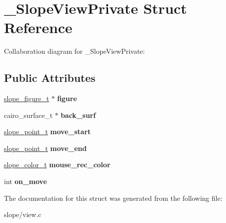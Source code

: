 \hypertarget{struct__SlopeViewPrivate}{\section{\+\_\+\+Slope\+View\+Private Struct Reference}
\label{struct__SlopeViewPrivate}
}


Collaboration diagram for \+\_\+\+Slope\+View\+Private\+:
\subsection*{Public Attributes}
\begin{DoxyCompactItemize}
\item 
\hypertarget{struct__SlopeViewPrivate_aafdec47c695b1fb1ed2374f55d4345ae}{\hyperlink{group__Figure_ga507cc82eeca8255d6c0f603ffdaeb59e}{slope\+\_\+figure\+\_\+t} $\ast$ {\bfseries figure}}\label{struct__SlopeViewPrivate_aafdec47c695b1fb1ed2374f55d4345ae}

\item 
\hypertarget{struct__SlopeViewPrivate_aa85fbecab3e04e09e70268e513a51aad}{cairo\+\_\+surface\+\_\+t $\ast$ {\bfseries back\+\_\+surf}}\label{struct__SlopeViewPrivate_aa85fbecab3e04e09e70268e513a51aad}

\item 
\hypertarget{struct__SlopeViewPrivate_a19d3d175ce68cbf2e30cd85249e7edf6}{\hyperlink{struct__slope__point}{slope\+\_\+point\+\_\+t} {\bfseries move\+\_\+start}}\label{struct__SlopeViewPrivate_a19d3d175ce68cbf2e30cd85249e7edf6}

\item 
\hypertarget{struct__SlopeViewPrivate_a1ff87d94e9ce2bfe356f4263e67a32cd}{\hyperlink{struct__slope__point}{slope\+\_\+point\+\_\+t} {\bfseries move\+\_\+end}}\label{struct__SlopeViewPrivate_a1ff87d94e9ce2bfe356f4263e67a32cd}

\item 
\hypertarget{struct__SlopeViewPrivate_ab248d01239b98c865d508e41aa38ac1e}{\hyperlink{struct__slope__color}{slope\+\_\+color\+\_\+t} {\bfseries mouse\+\_\+rec\+\_\+color}}\label{struct__SlopeViewPrivate_ab248d01239b98c865d508e41aa38ac1e}

\item 
\hypertarget{struct__SlopeViewPrivate_a956462aa9254d2beff0581b7449017c9}{int {\bfseries on\+\_\+move}}\label{struct__SlopeViewPrivate_a956462aa9254d2beff0581b7449017c9}

\end{DoxyCompactItemize}


The documentation for this struct was generated from the following file\+:\begin{DoxyCompactItemize}
\item 
slope/view.\+c\end{DoxyCompactItemize}

